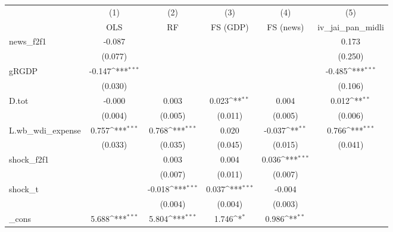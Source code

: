 {
\def\sym#1{\ifmmode^{#1}\else\(^{#1}\)\fi}
\begin{tabular}{l*{5}{c}}
\toprule
            &\multicolumn{1}{c}{(1)}&\multicolumn{1}{c}{(2)}&\multicolumn{1}{c}{(3)}&\multicolumn{1}{c}{(4)}&\multicolumn{1}{c}{(5)}\\
            &\multicolumn{1}{c}{OLS}&\multicolumn{1}{c}{RF}&\multicolumn{1}{c}{FS (GDP)}&\multicolumn{1}{c}{FS (news)}&\multicolumn{1}{c}{iv\_jai\_pan\_midli}\\
\midrule
news\_f2f1   &      -0.087         &                     &                     &                     &       0.173         \\
            &     (0.077)         &                     &                     &                     &     (0.250)         \\
\addlinespace
gRGDP       &      -0.147\sym{***}&                     &                     &                     &      -0.485\sym{***}\\
            &     (0.030)         &                     &                     &                     &     (0.106)         \\
\addlinespace
D.tot       &      -0.000         &       0.003         &       0.023\sym{**} &       0.004         &       0.012\sym{**} \\
            &     (0.004)         &     (0.005)         &     (0.011)         &     (0.005)         &     (0.006)         \\
\addlinespace
L.wb\_wdi\_expense&       0.757\sym{***}&       0.768\sym{***}&       0.020         &      -0.037\sym{**} &       0.766\sym{***}\\
            &     (0.033)         &     (0.035)         &     (0.045)         &     (0.015)         &     (0.041)         \\
\addlinespace
shock\_f2f1  &                     &       0.003         &       0.004         &       0.036\sym{***}&                     \\
            &                     &     (0.007)         &     (0.011)         &     (0.007)         &                     \\
\addlinespace
shock\_t     &                     &      -0.018\sym{***}&       0.037\sym{***}&      -0.004         &                     \\
            &                     &     (0.004)         &     (0.004)         &     (0.003)         &                     \\
\addlinespace
\_cons      &       5.688\sym{***}&       5.804\sym{***}&       1.746\sym{*}  &       0.986\sym{**} &                     \\

\end{tabular}}
